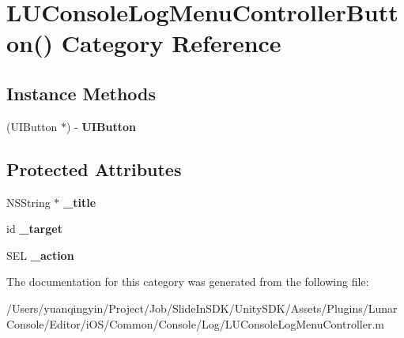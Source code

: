 \hypertarget{category_l_u_console_log_menu_controller_button_07_08}{}\section{L\+U\+Console\+Log\+Menu\+Controller\+Button() Category Reference}
\label{category_l_u_console_log_menu_controller_button_07_08}
\subsection*{Instance Methods}
\begin{DoxyCompactItemize}
\item 
\mbox{\label{category_l_u_console_log_menu_controller_button_07_08_aa25b18a149da54878be4387e5c679cae}} 
(U\+I\+Button $\ast$) -\/ {\bfseries U\+I\+Button}
\end{DoxyCompactItemize}
\subsection*{Protected Attributes}
\begin{DoxyCompactItemize}
\item 
\mbox{\label{category_l_u_console_log_menu_controller_button_07_08_ac044b646608239cb47157e8749a7dc4d}} 
N\+S\+String $\ast$ {\bfseries \+\_\+title}
\item 
\mbox{\label{category_l_u_console_log_menu_controller_button_07_08_aa33d6e2f984f4e3af14f2cfd481cdf4d}} 
id {\bfseries \+\_\+target}
\item 
\mbox{\label{category_l_u_console_log_menu_controller_button_07_08_a71d19e57ba92b6f8a0a33afe10c6b5fb}} 
S\+EL {\bfseries \+\_\+action}
\end{DoxyCompactItemize}


The documentation for this category was generated from the following file\+:\begin{DoxyCompactItemize}
\item 
/\+Users/yuanqingyin/\+Project/\+Job/\+Slide\+In\+S\+D\+K/\+Unity\+S\+D\+K/\+Assets/\+Plugins/\+Lunar\+Console/\+Editor/i\+O\+S/\+Common/\+Console/\+Log/L\+U\+Console\+Log\+Menu\+Controller.\+m\end{DoxyCompactItemize}
